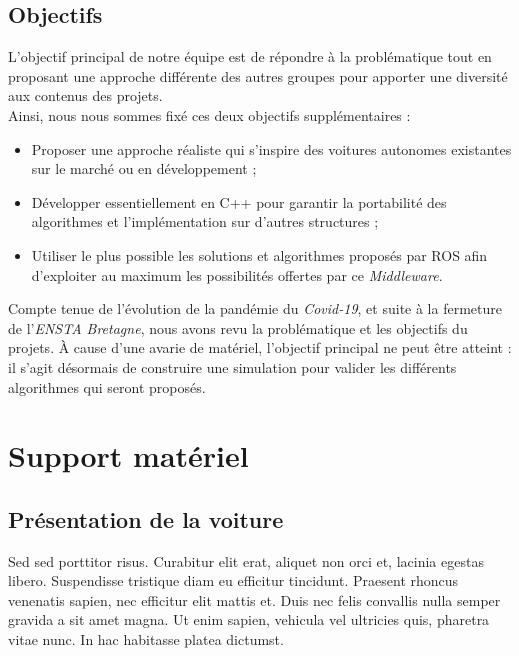 \documentclass[12pt, openany]{report}
\begin{document}
\subsection{Objectifs}
L'objectif principal de notre équipe est de répondre à la problématique tout en proposant une approche différente des autres groupes pour apporter une diversité aux contenus des projets.\\

Ainsi, nous nous sommes fixé ces deux objectifs supplémentaires : 
\begin{itemize}[label=\textbullet, font=\small]
    \item Proposer une approche réaliste qui s'inspire des voitures autonomes existantes sur le marché ou en développement ;
    \item Développer essentiellement en \textsc{C++} pour garantir la portabilité des algorithmes et l'implémentation sur d'autres structures ;\\
    \item Utiliser le plus possible les solutions et algorithmes proposés par \textsc{ROS} afin d'exploiter au maximum les possibilités offertes par ce \textit{Middleware}.\\
\end{itemize}

Compte tenue de l'évolution de la pandémie du \textit{Covid-19}, et suite à la fermeture de l'\textit{ENSTA Bretagne}, nous avons revu la problématique et les objectifs du projets. À cause d'une avarie de matériel, l'objectif principal ne peut être atteint : il s'agit désormais de construire une simulation pour valider les différents algorithmes qui seront proposés.

\section{Support matériel}
\subsection{Présentation de la voiture}
Sed sed porttitor risus. Curabitur elit erat, aliquet non orci et, lacinia egestas libero. Suspendisse tristique diam eu efficitur tincidunt. Praesent rhoncus venenatis sapien, nec efficitur elit mattis et. Duis nec felis convallis nulla semper gravida a sit amet magna. Ut enim sapien, vehicula vel ultricies quis, pharetra vitae nunc. In hac habitasse platea dictumst.\\
\end{document}
